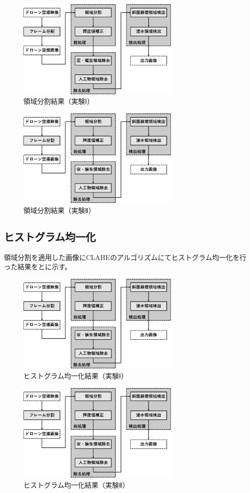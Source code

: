 \documentclass[../Thesis]{subfiles}
\begin{document}
\begin{figure}[h]
	\centering
	\includegraphics[width=8cm]{img/howto3.jpg}
	\caption{領域分割結果（実験Ⅰ）}
	\label{img03}
\end{figure}
\begin{figure}[h]
	\centering
	\includegraphics[width=8cm]{img/howto3.jpg}
	\caption{領域分割結果（実験Ⅱ）}
	\label{img04}
\end{figure}


\subsection{ヒストグラム均一化}
領域分割を適用した画像にCLAHEのアルゴリズムにてヒストグラム均一化を行った結果をとに示す。

\begin{figure}[h]
	\centering
	\includegraphics[width=8cm]{img/howto3.jpg}
	\caption{ヒストグラム均一化結果（実験Ⅰ）}
	\label{img05}
\end{figure}
\begin{figure}[h]
	\centering
	\includegraphics[width=8cm]{img/howto3.jpg}
	\caption{ヒストグラム均一化結果（実験Ⅱ）}
	\label{img06}
\end{figure}
\end{document}
